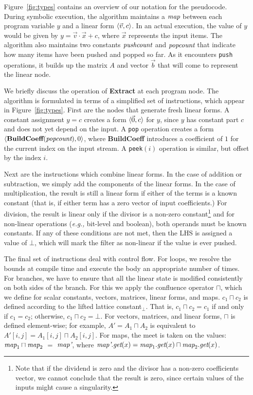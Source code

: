 Figure~\ref{fig:types} contains an overview of our notation for the
pseudocode.  During symbolic execution, the algorithm maintains a
$\mbox{\it map}$ between each program variable $y$ and a linear form
$\langle{{\vec v}}, {c}\rangle$. In an actual execution, the value of $y$ would be
given by $y = {\vec v} \cdot {\vec x} + c$, where ${\vec x}$
represents the input items.  The algorithm also maintains two
constants $\mbox{\it pushcount}$ and $\mbox{\it popcount}$ that indicate how many
items have been pushed and popped so far.  As it encounters {\tt push}
operations, it builds up the matrix $A$ and vector ${\vec b}$ that
will come to represent the linear node.

We briefly discuss the operation of {\bf Extract} at each program
node.  The algorithm is formulated in terms of a simplified set of
instructions, which appear in Figure~\ref{fig:types}.  First are the
nodes that generate fresh linear forms.  A constant assignment $y = c$
creates a form $\langle{\vec 0}, {c}\rangle$ for $y$, since $y$ has constant part
$c$ and does not yet depend on the input.  A {\tt pop} operation
creates a form $\langle{\mbox{\bf BuildCoeff}(\mbox{\it popcount})}, {0}\rangle$, where
{\bf BuildCoeff} introduces a coefficient of $1$ for the current index
on the input stream.  A {\tt peek}$(i)$ operation is similar, but
offset by the index $i$.

Next are the instructions which combine linear forms.  In the case of
addition or subtraction, we simply add the components of the linear
forms.  In the case of multiplication, the result is still a linear
form if either of the terms is a known constant (that is, if either
term has a zero vector of input coefficients.)  For division, the
result is linear only if the divisor is a non-zero
constant\footnote{Note that if the dividend is zero and the divisor
has a non-zero coefficients vector, we cannot conclude that the
result is zero, since certain values of the inputs might cause a
singularity.} and for non-linear operations ({\it e.g.,} bit-level and
boolean), both operands must be known constants.  If any of these
conditions are not met, then the LHS is assigned a value of $\bot$,
which will mark the filter as non-linear if the value is ever pushed.

The final set of instructions deal with control flow.  For loops, we
resolve the bounds at compile time and execute the body an appropriate
number of times.  For branches, we have to ensure that all the linear
state is modified consistently on both sides of the branch.  For this
we apply the confluence operator $\sqcap$, which we define for scalar
constants, vectors, matrices, linear forms, and maps.  $c_1 \sqcap
c_2$ is defined according to the lifted lattice constant$_{\bot}$.
That is, $c_1 \sqcap c_2 = c_1$ if and only if $c_1 = c_2$; otherwise,
$c_1 \sqcap c_2 = \bot$.  For vectors, matrices, and linear forms,
$\sqcap$ is defined element-wise; for example, $A' = A_1 \sqcap A_2$
is equivalent to $A'[i,j] = A_1[i,j] \sqcap A_2[i,j]$.  For maps, the
meet is taken on the values: $\mbox{\it map}_1 \sqcap \mbox{\it map}_2$ $=$
$\mbox{\it map'}$, where $\mbox{\it map'}.\mbox{\it get}(x) = \mbox{\it map}_1.\mbox{\it get}(x)
\sqcap \mbox{\it map}_2.\mbox{\it get}(x)$.

